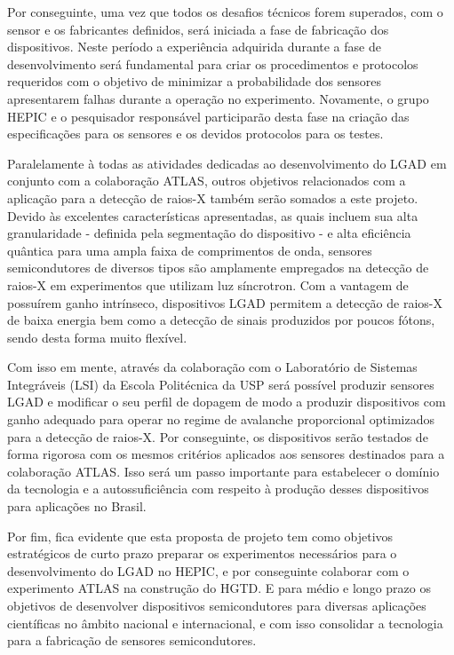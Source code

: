 Por conseguinte, uma vez que todos os desafios técnicos forem superados, com o sensor e os fabricantes definidos, será iniciada a fase de fabricação dos dispositivos. Neste período a experiência adquirida durante a fase de desenvolvimento será fundamental para criar os procedimentos e protocolos requeridos com o objetivo de minimizar a probabilidade dos sensores apresentarem falhas durante a operação no experimento. Novamente, o grupo HEPIC e o pesquisador responsável participarão desta fase na criação das especificações para os sensores e os devidos protocolos para os testes.     

Paralelamente à todas as atividades dedicadas ao desenvolvimento do LGAD em conjunto com a colaboração ATLAS, outros objetivos relacionados com a aplicação para a detecção de raios-X também serão somados a este projeto. Devido às excelentes características apresentadas, as quais incluem sua alta granularidade - definida pela segmentação do dispositivo - e alta eficiência quântica para uma ampla faixa de comprimentos de onda, sensores semicondutores de diversos tipos são amplamente empregados na detecção de raios-X em experimentos que utilizam luz síncrotron. Com a vantagem de possuírem ganho intrínseco, dispositivos LGAD permitem a detecção de raios-X de baixa energia bem como a detecção de sinais produzidos por poucos fótons, sendo desta forma muito flexível. 

Com isso em mente, através da colaboração com o Laboratório de Sistemas Integráveis (LSI) da Escola Politécnica da USP será possível produzir sensores LGAD e modificar o seu perfil de dopagem de modo a produzir dispositivos com ganho adequado para operar no regime de avalanche proporcional optimizados para a detecção de raios-X. Por conseguinte, os dispositivos serão testados de forma rigorosa com os mesmos critérios aplicados aos sensores destinados para a colaboração ATLAS. Isso será um passo importante para estabelecer o domínio da tecnologia e a autossuficiência com respeito à produção desses dispositivos para aplicações no Brasil.


Por fim, fica evidente que esta proposta de projeto tem como objetivos estratégicos de curto prazo preparar os experimentos necessários para o desenvolvimento do LGAD no HEPIC, e por conseguinte colaborar com o experimento ATLAS na construção do HGTD. E para médio e longo prazo os objetivos de desenvolver dispositivos semicondutores para diversas aplicações científicas no âmbito nacional e internacional, e com isso consolidar a tecnologia para a fabricação de sensores semicondutores.

